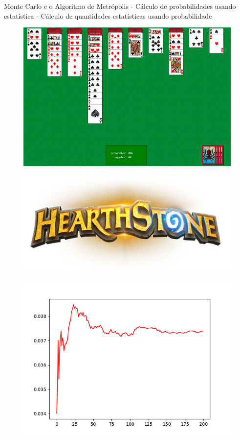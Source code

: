 \documentclass[10pt]{beamer}
\begin{document}
\begin{frame}{Monte Carlo e o Algoritmo de Metrópolis}
	- Cálculo de probabilidades usando estatística
	- Cálculo de quantidades estatísticas usando probabilidade	
	\begin{figure}[h]
		\center
		\includegraphics[scale=.25]{paci.jpg}
	\end{figure}
\end{frame}

\begin{frame}
	\begin{figure}[h]
		\center
		\includegraphics[scale=.3]{hearthstoneLogo.png}
	\end{figure}
	\begin{figure}[h]
		\includegraphics[scale=.4]{SimHS.png}
	\end{figure}
\end{frame}
\end{document}
